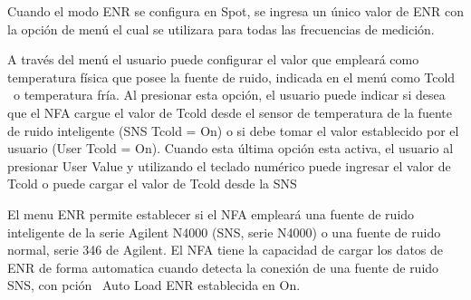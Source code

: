 \begin{minipage}[t]{\textwidth}
		Cuando el modo ENR se configura en Spot, se ingresa un único valor de ENR con la opción de
		menú el cual se utilizara para todas las frecuencias de medición.
		
		A través del menú el usuario puede configurar el valor que empleará como temperatura física que posee la fuente de ruido, indicada en el menú como Tcold \ o temperatura fría. Al presionar esta opción, el usuario puede indicar si desea que el NFA cargue el valor de Tcold desde el sensor de temperatura de la fuente de ruido inteligente (SNS Tcold = On) o si debe tomar el valor establecido por el usuario (User Tcold = On). Cuando esta última opción esta activa, el usuario al presionar User Value y utilizando el teclado numérico puede ingresar el valor de Tcold o puede cargar el valor de Tcold desde la SNS
		
		El menu ENR permite establecer si el NFA empleará una fuente de ruido inteligente de la serie Agilent N4000 (SNS, serie N4000) o una fuente de ruido normal, serie 346 de Agilent. El NFA tiene la capacidad de cargar los datos de ENR de forma automatica cuando detecta	la conexión de una fuente de ruido SNS, con pción \ Auto Load ENR establecida en On.
	\end{minipage}
	
	\newpage		
	
